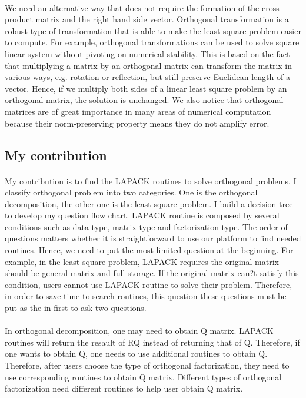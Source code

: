 \documentclass[pdftex,12pt,a4paper]{article}
\begin{document}
  \paragraph{}
We need an alternative way that does not require the formation of the cross-product matrix and the right hand side vector. Orthogonal transformation is a robust type of transformation that is able to make the least square problem easier to compute. For example, orthogonal transformations can be used to solve square linear system without pivoting on numerical stability. This is based on the fact that multiplying a matrix by an orthogonal matrix can transform the matrix in various ways, e.g. rotation or reflection, but still preserve Euclidean length of a vector. Hence, if we multiply both sides of a linear least square problem by an orthogonal matrix, the solution is unchanged. 
We also notice that orthogonal matrices are of great importance in many areas of numerical computation because their norm-preserving property means they do not amplify error. 
\subsection{My contribution} 
\paragraph{}
My contribution is to find the LAPACK routines to solve orthogonal problems. I classify orthogonal problem into two categories. One is the orthogonal decomposition, the other one is the least square problem. I build a decision tree to develop my question flow chart. LAPACK routine is composed by several conditions such as data type, matrix type and factorization type. 
The order of questions matters whether it is straightforward to use our platform to find needed routines. Hence, we need to put the most limited question at the beginning. For example, in the least square problem, LAPACK requires the original matrix should be general matrix and full storage. If the original matrix can?t satisfy this condition, users cannot use LAPACK routine to solve their problem. Therefore, in order to save time to search routines, this question these questions must be put as the in first to ask two questions. 
\paragraph{}
In orthogonal decomposition, one may need to obtain Q matrix. LAPACK routines will return the resault of RQ instead of returning that of Q. Therefore, if one wants to obtain Q, one needs to use additional routines to obtain Q. Therefore, after users choose the type of orthogonal factorization, they need to use corresponding routines to obtain Q matrix. Different types of orthogonal factorization need different routines to help user obtain Q matrix.
\end{document}
